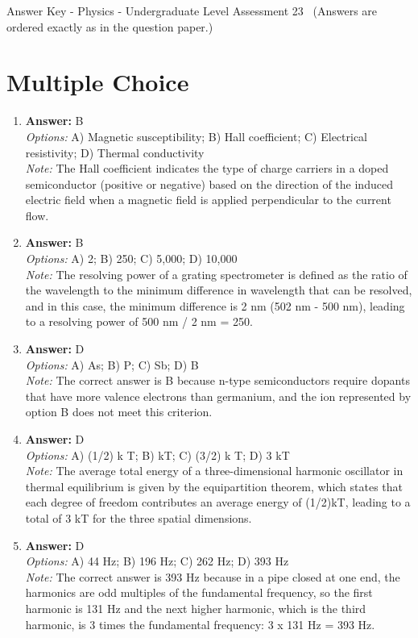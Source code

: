 \documentclass[12pt]{article}
\begin{document}
\begin{center}
Answer Key - Physics - Undergraduate Level Assessment 23 \
\small (Answers are ordered exactly as in the question paper.)
\end{center}

\section*{Multiple Choice}
\begin{enumerate}[label=\arabic*.]
\item \textbf{Answer:} B
\\ \textit{Options:} A) Magnetic susceptibility; B) Hall coefficient; C) Electrical resistivity; D) Thermal conductivity
\\ \textit{Note:} The Hall coefficient indicates the type of charge carriers in a doped semiconductor (positive or negative) based on the direction of the induced electric field when a magnetic field is applied perpendicular to the current flow.
\item \textbf{Answer:} B
\\ \textit{Options:} A) 2; B) 250; C) 5,000; D) 10,000
\\ \textit{Note:} The resolving power of a grating spectrometer is defined as the ratio of the wavelength to the minimum difference in wavelength that can be resolved, and in this case, the minimum difference is 2 nm (502 nm - 500 nm), leading to a resolving power of 500 nm / 2 nm = 250.
\item \textbf{Answer:} D
\\ \textit{Options:} A) As; B) P; C) Sb; D) B
\\ \textit{Note:} The correct answer is B because n-type semiconductors require dopants that have more valence electrons than germanium, and the ion represented by option B does not meet this criterion.
\item \textbf{Answer:} D
\\ \textit{Options:} A) (1/2) k T; B) kT; C) (3/2) k T; D) 3 kT
\\ \textit{Note:} The average total energy of a three-dimensional harmonic oscillator in thermal equilibrium is given by the equipartition theorem, which states that each degree of freedom contributes an average energy of (1/2)kT, leading to a total of 3 kT for the three spatial dimensions.
\item \textbf{Answer:} D
\\ \textit{Options:} A) 44 Hz; B) 196 Hz; C) 262 Hz; D) 393 Hz
\\ \textit{Note:} The correct answer is 393 Hz because in a pipe closed at one end, the harmonics are odd multiples of the fundamental frequency, so the first harmonic is 131 Hz and the next higher harmonic, which is the third harmonic, is 3 times the fundamental frequency: 3 x 131 Hz = 393 Hz.
\end{enumerate}
\end{document}
